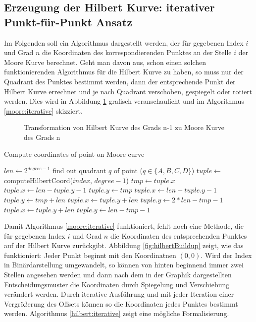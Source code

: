\documentclass[course=erap]{aspdoc}
\begin{document}
\subsection{Erzeugung der Hilbert Kurve: iterativer Punkt-für-Punkt Ansatz}
Im Folgenden soll ein Algorithmus dargestellt werden, der für gegebenen Index $i$ und Grad $n$ die Koordinaten des korrespondierenden Punktes an der Stelle $i$ der Moore Kurve berechnet.
Geht man davon aus, schon einen solchen funktionierenden Algorithmus für die Hilbert Kurve zu haben, so muss nur der Quadrant des Punktes bestimmt werden, dann der entsprechende Punkt der Hilbert Kurve errechnet und je nach Quadrant verschoben, gespiegelt oder rotiert werden. Dies wird in Abbildung \ref{HilbertZuMoore} grafisch veranschaulicht und im Algorithmus \ref{moore:iterative} skizziert.
\newline
\begin{figure}[h]
\centering
\def\svgwidth{240pt}

\caption{Transformation von Hilbert Kurve des Grads n-1 zu Moore Kurve des Grads n}
\label{HilbertZuMoore}
\end{figure}
\begin{algorithm}[H]
\begin{algorithmic}
\caption{Compute coordinates of point on Moore curve}
\label{moore:iterative}
	\State $len \leftarrow 2^{degree -1}$ 
	\State find out quadrant $q$ of point ($q \in \{A, B, C, D\}$)
	\State t$uple \leftarrow$ computeHilbertCoord($index$, $degree-1$)
	\State $tmp \leftarrow tuple.x$
		\State $tuple.x \leftarrow len - tuple.y - 1$
		\State $tuple.y \leftarrow tmp$
		\State $tuple.x \leftarrow len - tuple.y - 1$
		\State $tuple.y \leftarrow tmp + len$
		\State $tuple.x \leftarrow tuple.y + len$
		\State $tuple.y \leftarrow 2*len - tmp -1$
		\State $tuple.x \leftarrow tuple.y + len$
		\State $tuple.y \leftarrow len - tmp -1$
	\EndIf
\EndFunction
{}
	\State [...]
\EndFunction
\end{algorithmic}
\end{algorithm}
Damit Algorithmus \ref{moore:iterative} funktioniert, fehlt noch eine Methode, die für gegebenen Index $i$ und Grad $n$ die Koordinaten des entsprechenden Punktes auf der Hilbert Kurve zurückgibt. Abbildung \ref{fig:hilbertBuildup} zeigt, wie das funktioniert: Jeder Punkt beginnt mit den Koordinatnen $(0, 0)$. Wird der Index in Binärdarstellung umgewandelt, so können von hinten beginnend immer zwei Stellen angesehen werden und dann nach dem in der Graphik dargestellten Entscheidungsmuster die Koordinaten durch Spiegelung und Verschiebung verändert werden. Durch iterative Ausführung und mit jeder Iteration einer Vergrößerung des Offsets können so die Koordinaten jedes Punktes bestimmt werden. Algorithmus \ref{hilbert:iterative} zeigt eine mögliche Formalisierung.
\end{document}
